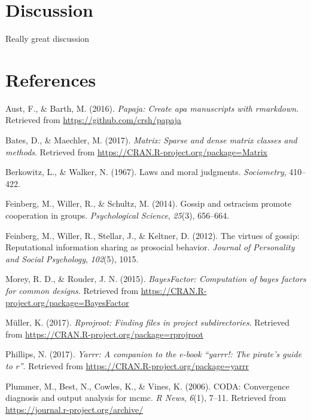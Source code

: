 \documentclass[english,pub]{apa6}
\theoremstyle{definition}
\theoremstyle{definition}
\theoremstyle{remark}
\begin{document}
\section{Discussion}\label{discussion}

Really great discussion

\newpage

\section{References}\label{references}

\setlength{\parindent}{-0.5in} \setlength{\leftskip}{0.5in}

\hypertarget{refs}{}
\hypertarget{ref-R-papaja}{}
Aust, F., \& Barth, M. (2016). \emph{Papaja: Create apa manuscripts with
rmarkdown}. Retrieved from \url{https://github.com/crsh/papaja}

\hypertarget{ref-R-Matrix}{}
Bates, D., \& Maechler, M. (2017). \emph{Matrix: Sparse and dense matrix
classes and methods}. Retrieved from
\url{https://CRAN.R-project.org/package=Matrix}

\hypertarget{ref-berkowitz1967laws}{}
Berkowitz, L., \& Walker, N. (1967). Laws and moral judgments.
\emph{Sociometry}, 410--422.

\hypertarget{ref-feinberg2014gossip}{}
Feinberg, M., Willer, R., \& Schultz, M. (2014). Gossip and ostracism
promote cooperation in groups. \emph{Psychological Science},
\emph{25}(3), 656--664.

\hypertarget{ref-feinberg2012virtues}{}
Feinberg, M., Willer, R., Stellar, J., \& Keltner, D. (2012). The
virtues of gossip: Reputational information sharing as prosocial
behavior. \emph{Journal of Personality and Social Psychology},
\emph{102}(5), 1015.

\hypertarget{ref-R-BayesFactor}{}
Morey, R. D., \& Rouder, J. N. (2015). \emph{BayesFactor: Computation of
bayes factors for common designs}. Retrieved from
\url{https://CRAN.R-project.org/package=BayesFactor}

\hypertarget{ref-R-rprojroot}{}
Müller, K. (2017). \emph{Rprojroot: Finding files in project
subdirectories}. Retrieved from
\url{https://CRAN.R-project.org/package=rprojroot}

\hypertarget{ref-R-yarrr}{}
Phillips, N. (2017). \emph{Yarrr: A companion to the e-book ``yarrr!:
The pirate's guide to r''}. Retrieved from
\url{https://CRAN.R-project.org/package=yarrr}

\hypertarget{ref-R-coda}{}
Plummer, M., Best, N., Cowles, K., \& Vines, K. (2006). CODA:
Convergence diagnosis and output analysis for mcmc. \emph{R News},
\emph{6}(1), 7--11. Retrieved from
\url{https://journal.r-project.org/archive/}
\end{document}

